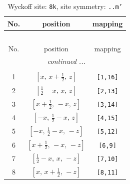 \documentclass[fleqn,8pt]{jsarticle}
\begin{document}
\begin{longtable}{ccc}
\caption{Wyckoff site: {\tt 8k}, site symmetry: {\tt ..m'}}
 \\
 \hline \hline
No. & position & mapping \\ \hline \endfirsthead

\multicolumn{2}{l}{\tablename\ \thetable{}} \\
 \hline \hline
No. & position & mapping \\ \hline \endhead

 \hline \hline
\multicolumn{2}{r}{\footnotesize\it continued ...} \\ \endfoot

 \hline \hline
\multicolumn{2}{r}{} \\ \endlastfoot

1 & $\left[ x,\, x + \frac{1}{2},\, z \right]$ & {\tt [1,16]} \\ \hline
2 & $\left[ \frac{1}{2} - x,\, x,\, z \right]$ & {\tt [2,13]} \\ \hline
3 & $\left[ x + \frac{1}{2},\, - x,\, z \right]$ & {\tt [3,14]} \\ \hline
4 & $\left[ - x,\, \frac{1}{2} - x,\, z \right]$ & {\tt [4,15]} \\ \hline
5 & $\left[ - x,\, \frac{1}{2} - x,\, - z \right]$ & {\tt [5,12]} \\ \hline
6 & $\left[ x + \frac{1}{2},\, - x,\, - z \right]$ & {\tt [6,9]} \\ \hline
7 & $\left[ \frac{1}{2} - x,\, x,\, - z \right]$ & {\tt [7,10]} \\ \hline
8 & $\left[ x,\, x + \frac{1}{2},\, - z \right]$ & {\tt [8,11]} \\
\end{longtable}
\renewcommand{\arraystretch}{1.2}
\end{document}
